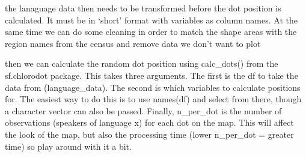 \documentclass[]{article}
\newenvironment{Shaded}{\begin{snugshade}}{\end{snugshade}}
\newcommand{\KeywordTok}[1]{\textcolor[rgb]{0.13,0.29,0.53}{\textbf{#1}}}
\newcommand{\DataTypeTok}[1]{\textcolor[rgb]{0.13,0.29,0.53}{#1}}
\newcommand{\StringTok}[1]{\textcolor[rgb]{0.31,0.60,0.02}{#1}}
\newcommand{\CommentTok}[1]{\textcolor[rgb]{0.56,0.35,0.01}{\textit{#1}}}
\newcommand{\OperatorTok}[1]{\textcolor[rgb]{0.81,0.36,0.00}{\textbf{#1}}}
\newcommand{\NormalTok}[1]{#1}
\begin{document}
the lanaguage data then needs to be transformed before the dot position
is calculated. It must be in `short' format with variables as column
names. At the same time we can do some cleaning in order to match the
shape areas with the region names from the census and remove data we
don't want to plot

\begin{Shaded}
\end{Shaded}

then we can calculate the random dot position using calc\_dots() from
the sf.chlorodot package. This takes three arguments. The first is the
df to take the data from (language\_data). The second is which variables
to calculate positions for. The easiest way to do this is to use
names(df) and select from there, though a character vector can also be
passed. Finally, n\_per\_dot is the number of observations (speakers of
language x) for each dot on the map. This will affect the look of the
map, but also the processing time (lower n\_per\_dot = greater time) so
play around with it a bit.
\end{document}
